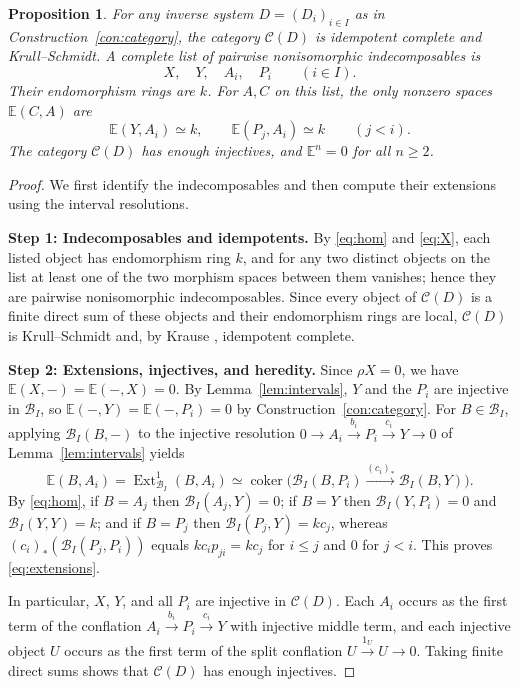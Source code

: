 \documentclass[a4paper,reqno,10pt]{amsart}
\numberwithin{equation}{section}
\newtheorem{proposition}[theorem]{Proposition}
\theoremstyle{definition}
\newcommand{\B}{\mathcal B}
\newcommand{\C}{\mathcal C}
\newcommand{\E}{\mathbb E}
\DeclareMathOperator{\Ext}{Ext}
\DeclareMathOperator{\coker}{coker}
\begin{document}
\begin{proposition}\label{prop:size}
For any inverse system $D=(D_i)_{i\in I}$ as in Construction~\ref{con:category},
the category $\C(D)$ is idempotent complete and Krull--Schmidt. A complete list
of pairwise nonisomorphic indecomposables is
\[
      X,\quad Y,\quad A_i,\quad P_i\qquad(i\in I).
\]
Their endomorphism rings are $k$. For $A,C$ on this list, the only nonzero
spaces $\E(C,A)$ are
\begin{equation}\label{eq:extensions}
   \E(Y,A_i)\simeq k,\qquad \E(P_j,A_i)\simeq k\qquad(j<i).
\end{equation}
The category $\C(D)$ has enough injectives, and $\E^n=0$ for all $n\ge 2$.
\end{proposition}
\begin{proof}
We first identify the indecomposables and then compute their extensions using
the interval resolutions.

\medskip\noindent\textbf{Step 1: Indecomposables and idempotents.}
By \eqref{eq:hom} and \eqref{eq:X}, each listed object has endomorphism ring
$k$, and for any two distinct objects on the list at least one of the two
morphism spaces between them vanishes; hence they are pairwise nonisomorphic
indecomposables. Since every object of $\C(D)$ is a finite direct sum of these
objects and their endomorphism rings are local, $\C(D)$ is Krull--Schmidt and,
by Krause \cite[Corollary~4.4]{Kr}, idempotent complete.

\medskip\noindent\textbf{Step 2: Extensions, injectives, and heredity.}
Since $\rho X=0$, we have $\E(X,-)=\E(-,X)=0$. By Lemma~\ref{lem:intervals},
$Y$ and the $P_i$ are injective in $\B_I$, so $\E(-,Y)=\E(-,P_i)=0$ by
Construction~\ref{con:category}. For $B\in\B_I$, applying $\B_I(B,-)$ to the
injective resolution $0\to A_i\xrightarrow{b_i}P_i\xrightarrow{c_i}Y\to0$ of
Lemma~\ref{lem:intervals} yields
\[
  \E(B,A_i)=\Ext^1_{\B_I}(B,A_i)\simeq\coker\bigl(\B_I(B,P_i)
                  \xrightarrow{(c_i)_*}\B_I(B,Y)\bigr).
\]
By \eqref{eq:hom}, if $B=A_j$ then $\B_I(A_j,Y)=0$; if $B=Y$ then
$\B_I(Y,P_i)=0$ and $\B_I(Y,Y)=k$; and if $B=P_j$ then $\B_I(P_j,Y)=kc_j$,
whereas $(c_i)_*(\B_I(P_j,P_i))$ equals $kc_i p_{ji}=kc_j$ for $i\le j$ and $0$
for $j<i$. This proves \eqref{eq:extensions}.

In particular, $X$, $Y$, and all $P_i$ are injective in $\C(D)$. Each $A_i$
occurs as the first term of the conflation $A_i\xrightarrow{b_i}P_i\xrightarrow{c_i}Y$
with injective middle term, and each injective object $U$ occurs as the first
term of the split conflation $U\xrightarrow{1_U}U\to0$. Taking finite direct
sums shows that $\C(D)$ has enough injectives.


\end{proof}
\end{document}
